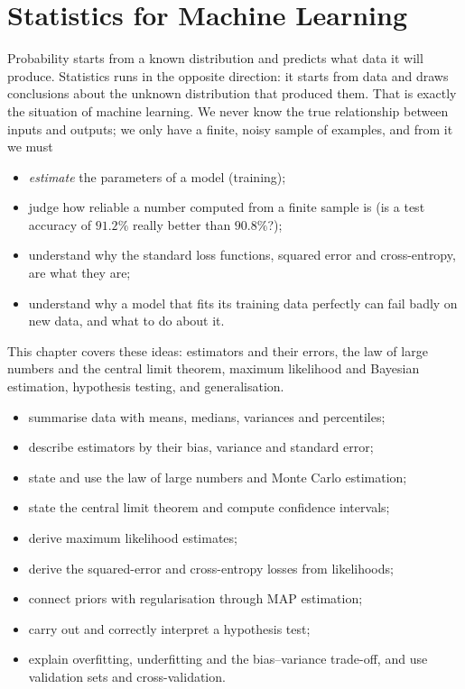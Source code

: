 \chapter{Statistics for Machine Learning}\label{ch:statistics}

\begin{motivation}
Probability starts from a known distribution and predicts what data it will
produce. Statistics runs in the opposite direction: it starts from data and
draws conclusions about the unknown distribution that produced them. That is
exactly the situation of machine learning. We never know the true relationship
between inputs and outputs; we only have a finite, noisy sample of examples,
and from it we must
\begin{itemize}
  \item \emph{estimate} the parameters of a model (training);
  \item judge how reliable a number computed from a finite sample is (is a test
    accuracy of $91.2\%$ really better than $90.8\%$?);
  \item understand why the standard loss functions, squared error and
    cross-entropy, are what they are;
  \item understand why a model that fits its training data perfectly can fail
    badly on new data, and what to do about it.
\end{itemize}
This chapter covers these ideas: estimators and their errors, the law of large
numbers and the central limit theorem, maximum likelihood and Bayesian
estimation, hypothesis testing, and generalisation.
\end{motivation}

\begin{objectives}
\begin{itemize}
  \item summarise data with means, medians, variances and percentiles;
  \item describe estimators by their bias, variance and standard error;
  \item state and use the law of large numbers and Monte Carlo estimation;
  \item state the central limit theorem and compute confidence intervals;
  \item derive maximum likelihood estimates;
  \item derive the squared-error and cross-entropy losses from likelihoods;
  \item connect priors with regularisation through MAP estimation;
  \item carry out and correctly interpret a hypothesis test;
  \item explain overfitting, underfitting and the bias--variance trade-off, and
    use validation sets and cross-validation.
\end{itemize}
\end{objectives}

